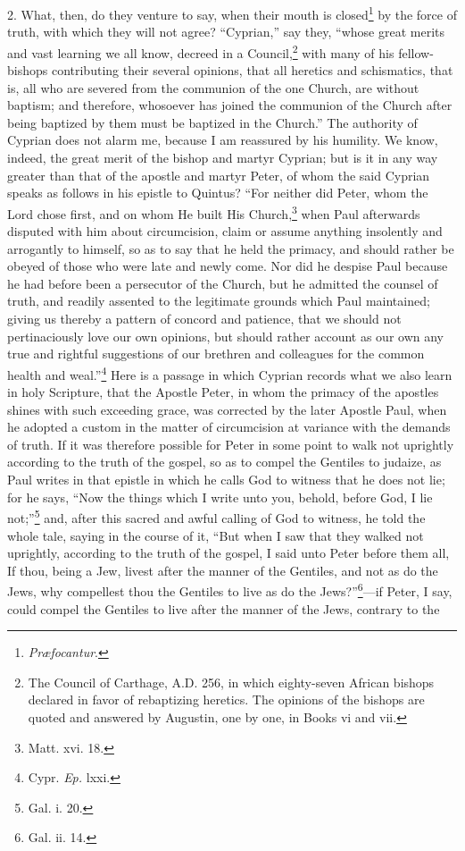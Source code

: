 2. What, then, do they venture to say, when their mouth is closed\footnote{\par  \emph{Præfocantur}.} by the force of truth, with which they will not agree? ``Cyprian,'' say they, ``whose great merits and vast learning we all know, decreed in a Council,\footnote{\par  The Council of Carthage,  A.D. 256, in which eighty-seven African bishops declared in favor of rebaptizing heretics. The opinions of the bishops are quoted and answered by Augustin, one by one, in Books vi and vii.} with many of his fellow-bishops contributing their several opinions, that all heretics and schismatics, that is, all who are severed from the communion of the one Church, are without baptism; and therefore, whosoever has joined the communion of the Church after being baptized by them must be baptized in the Church.'' The authority of Cyprian does not alarm me, because I am reassured by his humility. We know, indeed, the great merit of the bishop and martyr Cyprian; but is it in any way greater than that of the apostle and martyr Peter, of whom the said Cyprian speaks as follows in his epistle to Quintus? ``For neither did Peter, whom the Lord chose first, and on whom He built His Church,\footnote{\par  Matt. xvi. 18.} when Paul afterwards disputed with him about circumcision, claim or assume anything insolently and arrogantly to himself, so as to say that he held the primacy, and should rather be obeyed of those who were late and newly come. Nor did he despise Paul because he had before been a persecutor of the Church, but he admitted the counsel of truth, and readily assented to the legitimate grounds which Paul maintained; giving us thereby a pattern of concord and patience, that we should not pertinaciously love our own opinions, but should rather account as our own any true and rightful suggestions of our brethren and colleagues for the common health and weal.''\footnote{\par  Cypr. \emph{Ep.} lxxi.} Here is a passage in which Cyprian records what we also learn in holy Scripture, that the Apostle Peter, in whom the primacy of the apostles shines with such exceeding grace, was corrected by the later Apostle Paul, when he adopted a custom in the matter of circumcision at variance with the demands of truth. If it was therefore possible for Peter in some point to walk not uprightly according to the truth of the gospel, so as to compel the Gentiles to judaize, as Paul writes in that epistle in which he calls God to witness that he does not lie; for he says, ``Now the things which I write unto you, behold, before God, I lie not;''\footnote{\par  Gal. i. 20.} and, after this sacred and awful calling of God to witness, he told the whole tale, saying in the course of it, ``But when I saw that they walked not uprightly, according to the truth of the gospel, I said unto Peter before them all, If thou, being a Jew, livest after the manner of the Gentiles, and not as do the Jews, why compellest thou the Gentiles to live as do the Jews?''\footnote{\par  Gal. ii. 14.}—if Peter, I say, could compel the Gentiles to live after the manner of the Jews, contrary to the 